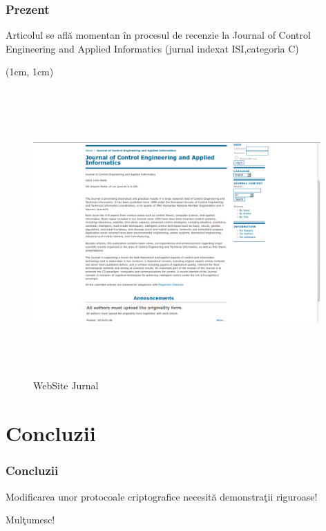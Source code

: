 \documentclass{beamer}
\theoremstyle{definition}
\begin{document}
\begin{frame}
    \frametitle{Prezent}
     {
        Articolul se afl\u{a} momentan \^{i}n procesul de recenzie la Journal of Control Engineering and Applied Informatics (jurnal indexat ISI,categoria C)
    }
     {
        \begin{center}
         \begin{textblock*}{4cm}(1cm, 1cm)
            \begin{figure}
                \includegraphics[width=11cm,height=11cm,keepaspectratio]{img/results/ceai.png}
                \caption{WebSite Jurnal}
           \end{figure}
        \end{textblock*} 
        \end{center} 
    }
\end{frame}
\section{Concluzii}

\begin{frame}
    \frametitle{Concluzii}
    Modificarea unor protocoale criptografice necesit\u{a} demonstra\c{t}ii riguroase!
\end{frame}
\begin{frame}
\Huge{\centerline{Mul\c{t}umesc!}}
\end{frame}
\end{document}
